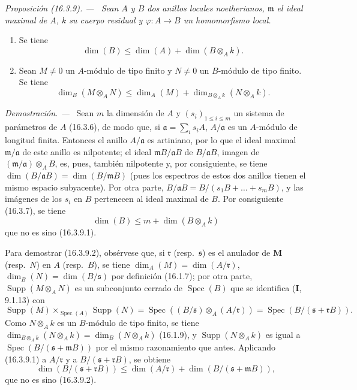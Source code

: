 \documentclass[10pt,oneside]{book}
\makeatletter
\newcommand{\setmanualcurrentlabel}[1]{\def\@currentlabel{#1}}
\newcommand{\oldpage}[2][]{%
  \setcounter{footnote}{0}%
  \marginpar{\scriptsize\textbf{#1}~|~#2}\ignorespaces}
\newenvironment{proposition}[1][]{%
  \setmanualcurrentlabel{#1}\par\medskip\noindent\itshape Proposición (#1). ---\ }{\par}
\newenvironment{proof}{%
  \par\medskip\noindent\textit{Demostración. ---\ }}{\par}
\makeatother
\begin{document}
\begin{proposition}[16.3.9]
\label{0.16.3.9-es}
Sean $A$ y $B$ dos anillos locales noetherianos, $\mathfrak{m}$ el ideal
maximal de $A$, $k$ su cuerpo residual y $\varphi:A\to B$ un homomorfismo
local.
\begin{enumerate}
  \item[\rm{(i)}] Se tiene
  \begin{equation}
  \label{0.16.3.9.1-es}
  \tag{16.3.9.1}
    \dim(B)\leq\dim(A)+\dim(B\otimes_A k).
  \end{equation}
  \item[\rm{(ii)}] Sean $M\neq0$ un $A$-módulo de tipo finito y $N\neq0$ un
  $B$-módulo de tipo finito. Se tiene
  \begin{equation}
  \label{0.16.3.9.2-es}
  \tag{16.3.9.2}
    \dim_B(M\otimes_A N)
    \leq\dim_A(M)+\dim_{B\otimes_A k}(N\otimes_A k).
  \end{equation}
\end{enumerate}
\end{proposition}

\begin{proof}
Sean $m$ la dimensión de $A$ y $(s_i)_{1\leq i\leq m}$ un sistema de
parámetros de $A$ (16.3.6), de modo que, si
$\mathfrak{a}=\sum_i s_iA$, $A/\mathfrak{a}$ es un $A$-módulo de longitud
finita. Entonces el anillo $A/\mathfrak{a}$ es artiniano, por lo que el ideal
maximal $\mathfrak{m}/\mathfrak{a}$ de este anillo es nilpotente; el ideal
$\mathfrak{m}B/\mathfrak{a}B$ de $B/\mathfrak{a}B$, imagen de
$(\mathfrak{m}/\mathfrak{a})\otimes_A B$, es, pues, también nilpotente y, por
consiguiente, se tiene
$\dim(B/\mathfrak{a}B)=\dim(B/\mathfrak{m}B)$ (pues los espectros de estos dos
anillos tienen el mismo espacio subyacente). Por otra parte,
$B/\mathfrak{a}B=B/(s_1B+\ldots+s_mB)$, y las imágenes de los $s_i$ en $B$
pertenecen al ideal maximal de $B$. Por consiguiente (16.3.7), se tiene
\[
  \dim(B)\leq m+\dim(B\otimes_A k)
\]
que no es sino (16.3.9.1).

Para demostrar (16.3.9.2), obsérvese que, si $\mathfrak{r}$
(resp.~$\mathfrak{s}$) es el anulador de $\mathbf M$ (resp.~$N$)
\oldpage[0\textsubscript{IV-1}]{32}
en $A$ (resp.~$B$), se tiene
$\dim_A(M)=\dim(A/\mathfrak{r})$, $\dim_B(N)=\dim(B/\mathfrak{s})$ por
definición (16.1.7); por otra parte, $\operatorname{Supp}(M\otimes_A N)$ es un
subconjunto cerrado de $\operatorname{Spec}(B)$ que se identifica (\textbf I, 9.1.13)
con
\[
  \operatorname{Supp}(M)\times_{\operatorname{Spec}(A)}\operatorname{Supp}(N)
  =\operatorname{Spec}((B/\mathfrak{s})\otimes_A(A/\mathfrak{r}))
  =\operatorname{Spec}(B/(\mathfrak{s}+\mathfrak{r}B)).
\]
Como $N\otimes_A k$ es un $B$-módulo de tipo finito, se tiene
$\dim_{B\otimes_A k}(N\otimes_A k)=\dim_B(N\otimes_A k)$ (16.1.9), y
$\operatorname{Supp}(N\otimes_A k)$ es igual a
$\operatorname{Spec}(B/(\mathfrak{s}+\mathfrak{m}B))$ por el mismo
razonamiento que antes. Aplicando (16.3.9.1) a $A/\mathfrak{r}$ y a
$B/(\mathfrak{s}+\mathfrak{r}B)$, se obtiene
\[
  \dim(B/(\mathfrak{s}+\mathfrak{r}B))
  \leq\dim(A/\mathfrak{r})+
  \dim(B/(\mathfrak{s}+\mathfrak{m}B)),
\]
que no es sino (16.3.9.2).
\end{proof}
\end{document}
